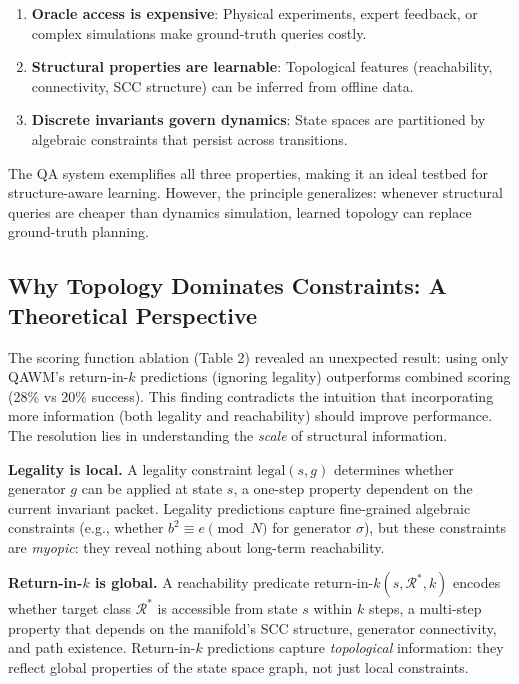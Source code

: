 \begin{enumerate}
\item \textbf{Oracle access is expensive}: Physical experiments, expert feedback, or complex simulations make ground-truth queries costly.
\item \textbf{Structural properties are learnable}: Topological features (reachability, connectivity, SCC structure) can be inferred from offline data.
\item \textbf{Discrete invariants govern dynamics}: State spaces are partitioned by algebraic constraints that persist across transitions.
\end{enumerate}

The QA system exemplifies all three properties, making it an ideal testbed for structure-aware learning. However, the principle generalizes: whenever structural queries are cheaper than dynamics simulation, learned topology can replace ground-truth planning.

\subsection{Why Topology Dominates Constraints: A Theoretical Perspective}

The scoring function ablation (Table 2) revealed an unexpected result: using only QAWM's return-in-$k$ predictions (ignoring legality) outperforms combined scoring (28\% vs 20\% success). This finding contradicts the intuition that incorporating more information (both legality and reachability) should improve performance. The resolution lies in understanding the \textit{scale} of structural information.

\textbf{Legality is local.} A legality constraint $\text{legal}(s, g)$ determines whether generator $g$ can be applied at state $s$, a one-step property dependent on the current invariant packet. Legality predictions capture fine-grained algebraic constraints (e.g., whether $b^2 \equiv e \pmod{N}$ for generator $\sigma$), but these constraints are \textit{myopic}: they reveal nothing about long-term reachability.

\textbf{Return-in-$k$ is global.} A reachability predicate $\text{return-in-}k(s, \mathcal{R}^*, k)$ encodes whether target class $\mathcal{R}^*$ is accessible from state $s$ within $k$ steps, a multi-step property that depends on the manifold's SCC structure, generator connectivity, and path existence. Return-in-$k$ predictions capture \textit{topological} information: they reflect global properties of the state space graph, not just local constraints.

